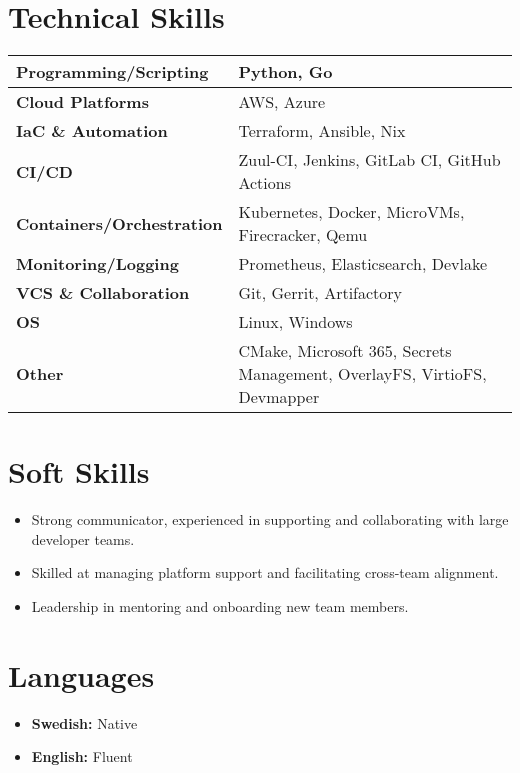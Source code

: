 \documentclass[11pt,a4paper]{article}
\begin{document}
\section{Technical Skills}
\begin{tabularx}{\textwidth}{|l|X|}
\hline
\textbf{Programming/Scripting} & Python, Go \\
\hline
\textbf{Cloud Platforms} & AWS, Azure \\
\hline
\textbf{IaC \& Automation} & Terraform, Ansible, Nix \\
\hline
\textbf{CI/CD} & Zuul-CI, Jenkins, GitLab CI, GitHub Actions \\
\hline
\textbf{Containers/Orchestration} & Kubernetes, Docker, MicroVMs, Firecracker, Qemu \\
\hline
\textbf{Monitoring/Logging} & Prometheus, Elasticsearch, Devlake \\
\hline
\textbf{VCS \& Collaboration} & Git, Gerrit, Artifactory \\
\hline
\textbf{OS} & Linux, Windows \\
\hline
\textbf{Other} & CMake, Microsoft 365, Secrets Management, OverlayFS, VirtioFS, Devmapper \\
\hline
\end{tabularx}

\section{Soft Skills}
\begin{itemize}[leftmargin=*]
    \item Strong communicator, experienced in supporting and collaborating with large developer teams.
    \item Skilled at managing platform support and facilitating cross-team alignment.
    \item Leadership in mentoring and onboarding new team members.
\end{itemize}

\section{Languages}
\begin{itemize}[leftmargin=*]
    \item \textbf{Swedish:} Native
    \item \textbf{English:} Fluent
\end{itemize}
\end{document}
